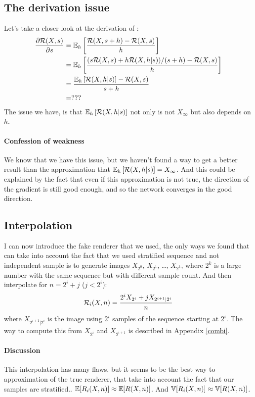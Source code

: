 \documentclass{classeENS}
\begin{document}
\subsection{The derivation issue}

Let's take a closer look at the derivation of \label{eq:4}:
\begin{align*}
    \label{eq:4}
 \frac{\partial \mathcal R(X,s)}{\partial s} & = \mathbb E_h \left [\frac{\mathcal R(X,s+h) - \mathcal R(X,s)}{h} \right ] \\
    & = \mathbb E_h \left [\frac{(s\mathcal R(X,s) + h\mathcal R(X,h | s))/(s+h) - \mathcal R(X,s)}{h}\right ] \\
    & = \frac{\mathbb E_h \left [\mathcal R(X,h | s) \right ] - \mathcal R(X,s)}{s+h} \\
    & = ???
\end{align*}
The issue we have, is that $\mathbb E_h \left [\mathcal R(X,h | s) \right ]$ not only is not $X_\infty$ 
but also depends on $h$.

\paragraph*{Confession of weakness} We know that we have this issue, but we haven't found 
a way to get a better result than the approximation that 
$\mathbb E_h \left [\mathcal R(X,h | s) \right ] = X_\infty$. And this could be explained by the fact that 
even if this approximation is not true, the direction of the gradient is still good 
enough, and so the network converges in the good direction.

\subsection{Interpolation}

I can now introduce the fake renderer that we used, the only ways we found that can
take into account the fact that we used stratified sequence and not independent sample
is to generate images $X_{2^0}$, $X_{2^1}$, \dots, $X_{2^k}$, where $2^k$ is a large number
with the same sequence but with different sample count. And then interpolate for 
$n = 2^i + j$ ($j < 2^i$):
\begin{equation}
    \label{eq:5}
    \mathcal R_i(X,n) = \frac{2^i X_{2^i} + j X_{2^{i+1} | 2^i}}{n}
\end{equation}
where $X_{2^{i+1} | 2^i}$ is the image using $2^i$ samples of the sequence starting at 
$2^i$. The way to compute this from $X_{2^i}$ and $X_{2^{i+1}}$ is described in Appendix \ref{combi}.

\paragraph*{Discussion} This interpolation has many flaws, but it seems to be 
 the best way to approximation of the true renderer, that take into 
 account the fact that our samples are stratified.. $\mathbb E[R_i(X,n)] \approx \mathbb E[R(X,n)]$. 
 And $\mathbb V[R_i(X,n)] \approx \mathbb V[R(X,n)]$.
\end{document}
